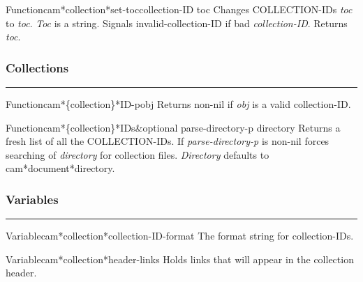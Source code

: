 \begin{functiondoc}{Function}{cam*collection*set-toc}{collection-ID toc}
Changes COLLECTION-IDs {\em toc} to {\em toc}.
{\em Toc} is a string.
Signals invalid-collection-ID if bad {\em collection-ID}.
Returns {\em toc}.
\end{functiondoc}


\subsubsection*{Collections}
\par\vspace*{0.00in}\par\hrule\par\medskip\par


\begin{functiondoc}{Function}{cam*\{collection\}*ID-p}{obj}
Returns non-nil if {\em obj} is a valid collection-ID.
\end{functiondoc}

\begin{functiondoc}{Function}{cam*\{collection\}*IDs}{\&optional parse-directory-p directory}
Returns a fresh list of all the COLLECTION-IDs.
If {\em parse-directory-p} is non-nil forces searching of {\em directory} for collection files.
{\em Directory} defaults to cam*document*directory.
\end{functiondoc}


\subsubsection*{Variables}
\par\vspace*{0.00in}\par\hrule\par\medskip\par


\begin{functiondoc}{Variable}{cam*collection*collection-ID-format}{}
The format string for collection-IDs.
\end{functiondoc}

\begin{functiondoc}{Variable}{cam*collection*header-links}{}
Holds links that will appear in the collection header.
\end{functiondoc}


